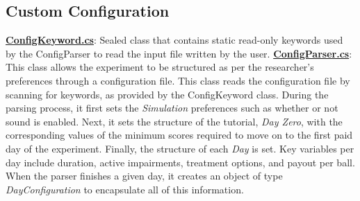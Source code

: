 \documentclass{article}
\begin{document}
\subsection*{Custom Configuration} 
\href{https://bit.ly/2TWgOwJ}{\textbf{ConfigKeyword.cs}}: Sealed class that contains static read-only keywords used by the ConfigParser to read the input file written by the user. \newline \newline
\href{https://bit.ly/2TZaLYj}{\textbf{ConfigParser.cs}}: This class allows the experiment to be structured as per the researcher's preferences through a configuration file. This class reads the configuration file by scanning for keywords, as provided by the ConfigKeyword class. During the parsing process, it first sets the \textit{Simulation} preferences such as whether or not sound is enabled. Next, it sets the structure of the tutorial, \textit{Day Zero}, with the corresponding values of the minimum scores required to move on to the first paid day of the experiment. Finally, the structure of each \textit{Day} is set. Key variables per day include duration, active impairments, treatment options, and payout per ball. When the parser finishes a given day, it creates an object of type \textit{DayConfiguration} to encapsulate all of this information.
\end{document}

